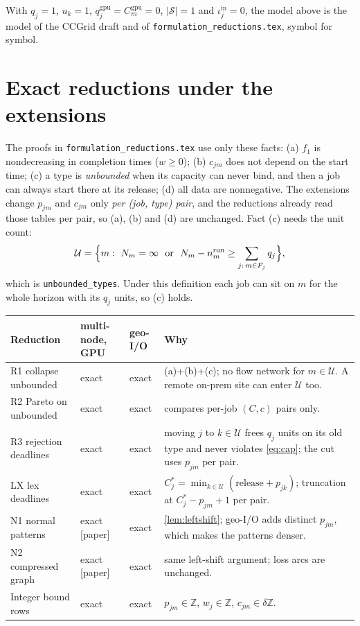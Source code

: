 \documentclass[11pt,a4paper]{article}
\newcommand{\U}{\mathcal{U}}
\newcommand{\Sites}{\mathcal{S}}
\newcommand{\Z}{\mathbb{Z}}
\newcommand{\code}[1]{\texttt{#1}}
\newcommand{\pin}{\mathrm{in}}
\newcommand{\run}{\mathrm{run}}
\newcommand{\status}[1]{\textsf{\small[#1]}}
\begin{document}
\begin{remark}\label{rem:reduces}
With $q_j=1$, $u_k=1$, $q^{\mathrm{gpu}}_j=C^{\mathrm{gpu}}_m=0$,
$|\Sites|=1$ and $\iota^\pin_j=0$, the model above is the model of the CCGrid
draft and of \code{formulation\_reductions.tex}, symbol for symbol.
\end{remark}

\section{Exact reductions under the extensions}\label{sec:reductions}

The proofs in \code{formulation\_reductions.tex} use only these facts:
(a) $f_1$ is nondecreasing in completion times ($w\ge0$); (b) $c_{jm}$ does
not depend on the start time; (c) a type is \emph{unbounded} when its capacity
can never bind, and then a job can always start there at its release; (d) all
data are nonnegative. The extensions change $p_{jm}$ and $c_{jm}$ only
\emph{per (job, type) pair}, and the reductions already read those tables per
pair, so (a), (b) and (d) are unchanged. Fact (c) needs the unit count:
\[
  \U=\Bigl\{m:\ N_m=\infty\ \ \text{or}\ \ N_m-n^\run_m\ge\sum_{j:\,m\in F_j}q_j\Bigr\},
\]
which is \code{unbounded\_types}. Under this definition each job can sit on
$m$ for the whole horizon with its $q_j$ units, so (c) holds.

\begin{center}
\renewcommand{\arraystretch}{1.15}
\begin{longtable}{@{}p{3.1cm}p{1.7cm}p{1.7cm}p{7.0cm}@{}}
\toprule
Reduction & multi-node, GPU & geo-I/O & Why \\
\midrule
\endhead
R1 collapse unbounded & exact & exact & (a)+(b)+(c); no flow network for $m\in\U$. A remote on-prem site can enter $\U$ too. \\
R2 Pareto on unbounded & exact & exact & compares per-job $(C,c)$ pairs only. \\
R3 rejection deadlines & exact & exact & moving $j$ to $k\in\U$ frees $q_j$ units on its old type and never violates \eqref{eq:cap}; the cut uses $p_{jm}$ per pair. \\
LX lex deadlines & exact & exact & $C^*_j=\min_{k\in\U}(\text{release}+p_{jk})$; truncation at $C^*_j-p_{jm}+1$ per pair. \\
N1 normal patterns & exact \status{paper} & exact & \cref{lem:leftshift}; geo-I/O adds distinct $p_{jm}$, which makes the patterns denser. \\
N2 compressed graph & exact \status{paper} & exact & same left-shift argument; loss arcs are unchanged. \\
Integer bound rows & exact & exact & $p_{jm}\in\Z$, $w_j\in\Z$, $c_{jm}\in\delta\Z$. \\
\bottomrule
\end{longtable}
\end{center}
\end{document}
